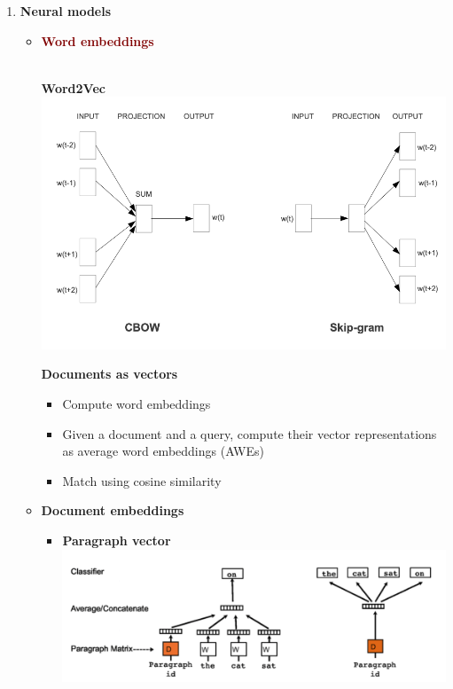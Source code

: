\begin{enumerate}
\begin{itemize}
    \end{itemize}
    \item \textbf{Neural models}
    \begin{itemize}
        \item \textbf{\textcolor{Maroon}{Word embeddings}} \\
        \\
        \begin{minipage}{0.5\textwidth}
        \textbf{Word2Vec} \\
            \includegraphics[scale=0.48]{figures/word2vec.png}
        \end{minipage}
        \begin{minipage}{0.4\textwidth}
        \textbf{ \;\;\; Documents as vectors} \\
        \begin{itemize}
            \setlength\itemsep{0em}
            \item Compute word embeddings
            \item Given a document and a query, compute their vector representations as average word embeddings (AWEs)
            \item Match using cosine similarity \\
        \end{itemize}
        \end{minipage}
        \item \textbf{\textcolor{PineGreen}{Document embeddings}}
        \begin{itemize}
            \item \textbf{Paragraph vector} \\
            \includegraphics[scale=0.5]{figures/paragraph vector.png}
            

\end{itemize}
\end{itemize}
\end{enumerate}
